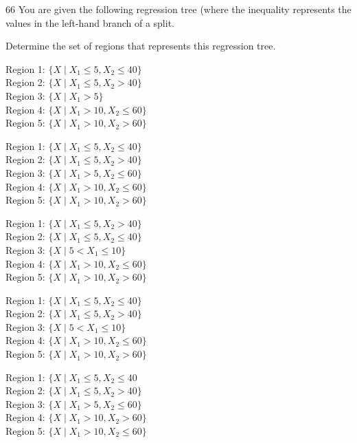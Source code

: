 \begin{question}{66}
You are given the following regression tree (where the inequality represents the values in the left-hand branch of a split.


Determine the set of regions that represents this regression tree.

\begin{choices}
\item Region 1: $\{X \mid X_1 \leqslant 5, X_2 \leqslant 40\}$ \\
Region 2: $\{X \mid X_1 \leqslant 5, X_2 > 40\}$ \\
Region 3: $\{X \mid X_1 > 5\}$ \\
Region 4: $\{X \mid X_1 > 10, X_2 \leqslant 60\}$ \\
Region 5: $\{X \mid X_1 > 10, X_2 > 60\}$

\item Region 1: $\{X \mid X_1 \leqslant 5, X_2 \leqslant 40\}$ \\
Region 2: $\{X \mid X_1 \leqslant 5, X_2 > 40\}$ \\
Region 3: $\{X \mid X_1 > 5, X_2 \leqslant 60\}$ \\
Region 4: $\{X \mid X_1 > 10, X_2 \leqslant 60\}$ \\
Region 5: $\{X \mid X_1 > 10, X_2 > 60\}$

\item Region 1: $\{X \mid X_1 \leqslant 5, X_2 > 40\}$ \\
Region 2: $\{X \mid X_1 \leqslant 5, X_2 \leqslant 40\}$ \\
Region 3: $\{X \mid 5 < X_1 \leqslant 10\}$ \\
Region 4: $\{X \mid X_1 > 10, X_2 \leqslant 60\}$ \\
Region 5: $\{X \mid X_1 > 10, X_2 > 60\}$

\item Region 1: $\{X \mid X_1 \leqslant 5, X_2 \leqslant 40\}$ \\
Region 2: $\{X \mid X_1 \leqslant 5, X_2 > 40\}$ \\
Region 3: $\{X \mid 5 < X_1 \leqslant 10\}$ \\
Region 4: $\{X \mid X_1 > 10, X_2 \leqslant 60\}$ \\
Region 5: $\{X \mid X_1 > 10, X_2 > 60\}$

\item %
Region 1: $\{X \mid X_1 \leqslant 5, X_2 \leqslant 40$ \\
Region 2: $\{X \mid X_1 \leqslant 5, X_2 > 40\}$ \\
Region 3: $\{X \mid X_1 > 5, X_2 \leqslant 60\}$ \\
Region 4: $\{X \mid X_1 > 10, X_2 > 60\}$ \\
Region 5: $\{X \mid X_1 > 10, X_2 \leqslant 60\}$
\end{choices}
\end{question}

